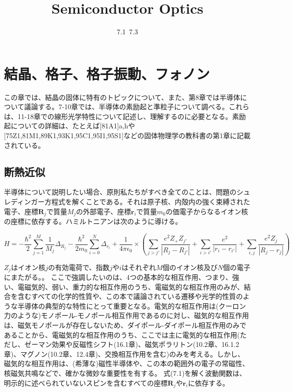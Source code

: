 \documentclass[11pt,a4j,uplatex]{jsarticle}
\title{Semiconductor Optics}
\author{7.1~7.3}
\begin{document}
 \maketitle %

 \thispagestyle{empty}%
 \clearpage
 \addtocounter{page}{-1}


 \tableofcontents %

 \thispagestyle{empty}%
 \clearpage
 \addtocounter{page}{-1}

\fi
\setcounter{section}{6}
\setcounter{subsection}{1}
\setcounter{figure}{0}
\newpage
\section{結晶、格子、格子振動、フォノン}
この章では、結晶の固体に特有のトピックについて、また、第8章では半導体について議論する。7-10章では、半導体の素励起と準粒子について調べる。これらは、11-18章での線形光学特性について記述し、理解するのに必要となる。素励起についての詳細は、たとえば[81A1]a,hや[75Z1,81M1,89K1,93K1,95C1,95I1,95S1]などの固体物理学の教科書の第1章に記載されている。
\subsection{断熱近似}
半導体について説明したい場合、原則私たちがすべき全てのことは、問題のシュレディンガー方程式を解くことである。それは原子核、内殻内の強く束縛された電子、座標$\bm{R}_j$で質量$M_j$の外部電子、座標$\bm{r}_i$で質量$m_0$の価電子からなるイオン核の座標に依存する。ハミルトニアンは次のように導ける。

\begin{equation}
  H=-\frac{{\hbar}^2}{2}\sum_{j=1}^M\frac{1}{M_j}\Delta_{R_j}-\frac{\hbar^2}{2m_0}\sum_{i=0}^N\Delta_{r_i}+\frac{1}{4\pi\epsilon_0}\times(\sum_{j>j'}\frac{e^2Z_+Z_{j'}}{|R_j-R_{j'}|}+\sum_{i>i'}\frac{e^2}{|r_i-r_{i'}|}+\sum_{i,j}\frac{e^2Z_j}{|R_j-r_j|})\tag{7.1}
\end{equation}

$Z_j$はイオン核$j$の有効電荷で、指数$j$や$i$はそれぞれ$M$個のイオン核及び$N$個の電子にまたがる。。
ここで強調したいのは、4つの基本的な相互作用、つまり、強い、電磁気的、弱い、重力的な相互作用のうち、電磁気的な相互作用のみが、結合を含むすべての化学的性質や、この本で議論されている遷移や光学的性質のような半導体の典型的な特性にとって重要となる。電気的な相互作用は(クーロン力のような)モノポール-モノポール相互作用であるのに対し、磁気的な相互作用は、磁気モノポールが存在しないため、ダイポール-ダイポール相互作用のみであることから、電磁気的な相互作用のうち、ここでは主に電気的な相互作用(ただし、ゼーマン効果や反磁性シフト(16.1章)、磁気ポラリトン(10.2章、16.1.2章)、マグノン(10.2章、12.4章)、交換相互作用を含む)のみを考える。しかし、磁気的な相互作用は、(希薄な)磁性半導体や、この本の範囲外の電子の常磁性、核磁気共鳴などで、確かな微妙な重要性を有する。
式(7.1)を解く波動関数は、明示的に述べられていないスピンを含むすべての座標$\bm{R}_j$や$\bm{r}_i$に依存する。
\end{document}
